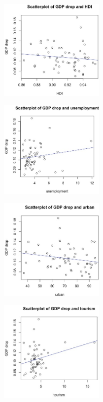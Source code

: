 \documentclass{article}
\begin{document}
\begin{figure}[H]
\centering
\begin{minipage}{.5\textwidth}
  \centering
  \includegraphics[width= 5.1cm]{HDI.jpg}
  \label{fig:HDI}
\end{minipage}%
\begin{minipage}{.5\textwidth}
  \centering
  \includegraphics[width= 5.1cm]{unemployment.jpg}
  \label{fig:unemploymeent}
\end{minipage}
\centering
\begin{minipage}{.5\textwidth}
  \centering
  \includegraphics[width= 5.1cm]{urban.jpg}
  \label{fig:urban}
\end{minipage}%
\begin{minipage}{.5\textwidth}
  \centering
  \includegraphics[width= 5.1cm]{tourism.jpg}
  \label{fig:tourism}
\end{minipage}
\end{figure}
\end{document}
